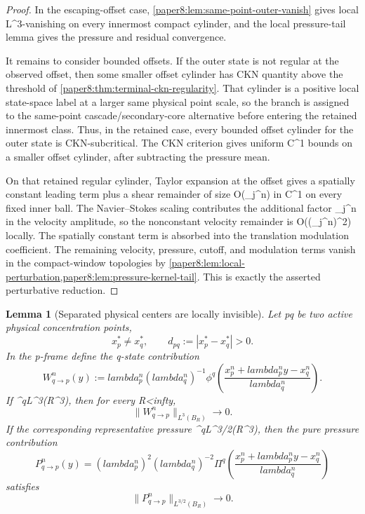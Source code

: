 \documentclass[11pt]{amsart}
\def\({}%
\def\){}%
\def\mathbb#1{#1}%
\def\lambda{lambda}%
\def\infty{infty}%
\theoremstyle{plain}
\newtheorem{lemma}[lemma]{Lemma}
\theoremstyle{definition}
\theoremstyle{remark}
\begin{document}
\begin{proof}
In the escaping-offset case, \cref{paper8:lem:same-point-outer-vanish} gives
local \(L^3\)-vanishing on every innermost compact cylinder, and the local
pressure-tail lemma gives the pressure and residual convergence.

It remains to consider bounded offsets.  If the outer state is not regular at
the observed offset, then some smaller offset cylinder has CKN quantity above
the threshold of \cref{paper8:thm:terminal-ckn-regularity}.  That cylinder is a
positive local state-space label at a larger same physical point scale, so the
branch is assigned to the same-point cascade/secondary-core alternative before
entering the retained innermost class.  Thus, in the retained case, every
bounded offset cylinder for the outer state is CKN-subcritical.  The CKN
criterion gives uniform \(C^1\) bounds on a smaller offset cylinder, after
subtracting the pressure mean.

On that retained regular cylinder, Taylor expansion at the offset gives a
spatially constant leading term plus a shear remainder of size \(O(\mu_j^n)\)
in \(C^1\) on every fixed inner ball.  The Navier--Stokes scaling contributes
the additional factor \(\mu_j^n\) in the velocity amplitude, so the nonconstant
velocity remainder is \(O((\mu_j^n)^2)\) locally.  The spatially constant term
is absorbed into the translation modulation coefficient.  The remaining
velocity, pressure, cutoff, and modulation terms vanish in the compact-window
topologies by
\cref{paper8:lem:local-perturbation,paper8:lem:pressure-kernel-tail}.  This is
exactly the asserted perturbative reduction.
\end{proof}

\begin{lemma}[Separated physical centers are locally invisible]
\label{paper8:lem:separated-centers-vanish}
Let \(p\ne q\) be two active physical concentration points,
\[
  x_p^*\ne x_q^*,
  \qquad
  d_{pq}:=|x_p^*-x_q^*|>0.
\]
In the \(p\)-frame define the \(q\)-state contribution
\[
  W_{q\to p}^n(y)
  :=
  \lambda_p^n(\lambda_q^n)^{-1}
  \phi^q\left(
  \frac{x_p^n+\lambda_p^ny-x_q^n}{\lambda_q^n}
  \right).
\]
If \(\phi^q\in L^3(\mathbb R^3)\), then for every \(R<\infty\),
\[
  \|W_{q\to p}^n\|_{L^3(B_R)}\to0.
\]
If the corresponding representative pressure \(\Pi^q\in L^{3/2}(\mathbb R^3)\), then
the pure pressure contribution
\[
  P_{q\to p}^n(y)
  =
  (\lambda_p^n)^2(\lambda_q^n)^{-2}
  \Pi^q\left(
  \frac{x_p^n+\lambda_p^ny-x_q^n}{\lambda_q^n}
  \right)
\]
satisfies
\[
  \|P_{q\to p}^n\|_{L^{3/2}(B_R)}\to0 .
\]
\end{lemma}
\end{document}
